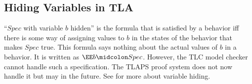\documentclass[fleqn,leqno]{article}
\begin{document}
\subsection*{%
%
Hiding Variables in TLA}

\setlength{\parindent}{1.5em}

``$Spec$ with variable $b$ hidden'' is the formula that is satisfied
by a behavior iff there is some way of assigning values to $b$ in the
states of the behavior that makes $Spec$ true.  This formula says
nothing about the actual values of $b$ in a behavior.  It is written
as $\EE b\midcolon Spec$.  However, the TLC model checker cannot
handle such a specification.  The TLAPS proof system does not now
handle it but may in the future.  See
for more about variable hiding.
\end{document}
